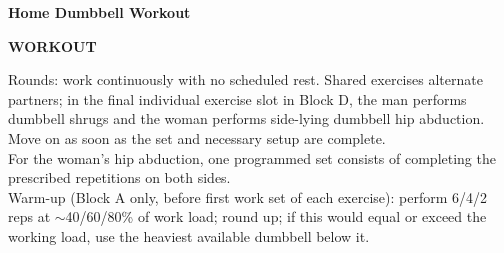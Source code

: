 \documentclass[11pt,a4paper]{article}
\begin{document}
\begin{center}
{\fontsize{26}{31}\selectfont\bfseries Home Dumbbell Workout}
\end{center}

\vspace{0.42cm}

\noindent
\begin{minipage}[t]{0.68\linewidth}
{\fontsize{14}{17}\selectfont\bfseries WORKOUT}
\end{minipage}%
\begin{minipage}[t]{0.32\linewidth}
\raggedleft
{}
\end{minipage}

\vspace{0.10cm}
{\fontsize{7.9}{9.4}\selectfont\color{muted}
Rounds: work continuously with no scheduled rest. Shared exercises alternate partners; in the final individual exercise slot in Block D, the man performs dumbbell shrugs and the woman performs side-lying dumbbell hip abduction. Move on as soon as the set and necessary setup are complete.\\[0.08cm]
For the woman's hip abduction, one programmed set consists of completing the prescribed repetitions on both sides.\\[0.08cm]
Warm-up (Block A only, before first work set of each exercise): perform 6/4/2 reps at $\sim$40/60/80\% of work load; round up; if this would equal or exceed the working load, use the heaviest available dumbbell below it.
}
\end{document}
